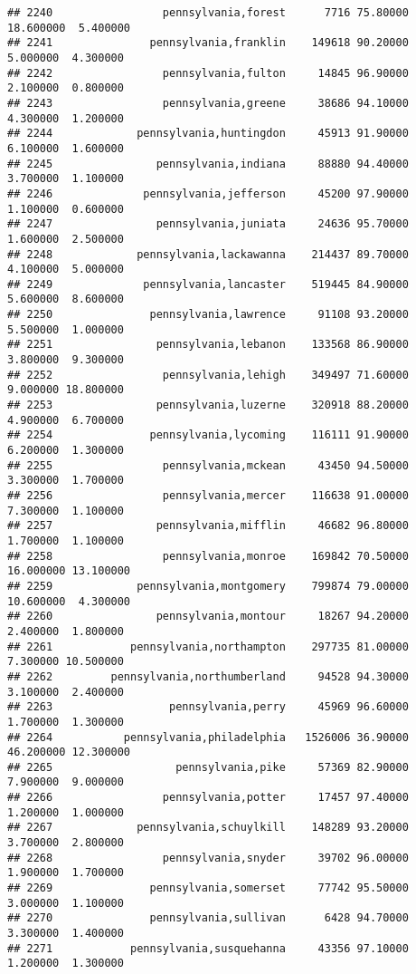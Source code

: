 \documentclass[
]{article}
\begin{document}
\begin{verbatim}
## 2240                 pennsylvania,forest      7716 75.80000 18.600000  5.400000
## 2241               pennsylvania,franklin    149618 90.20000  5.000000  4.300000
## 2242                 pennsylvania,fulton     14845 96.90000  2.100000  0.800000
## 2243                 pennsylvania,greene     38686 94.10000  4.300000  1.200000
## 2244             pennsylvania,huntingdon     45913 91.90000  6.100000  1.600000
## 2245                pennsylvania,indiana     88880 94.40000  3.700000  1.100000
## 2246              pennsylvania,jefferson     45200 97.90000  1.100000  0.600000
## 2247                pennsylvania,juniata     24636 95.70000  1.600000  2.500000
## 2248             pennsylvania,lackawanna    214437 89.70000  4.100000  5.000000
## 2249              pennsylvania,lancaster    519445 84.90000  5.600000  8.600000
## 2250               pennsylvania,lawrence     91108 93.20000  5.500000  1.000000
## 2251                pennsylvania,lebanon    133568 86.90000  3.800000  9.300000
## 2252                 pennsylvania,lehigh    349497 71.60000  9.000000 18.800000
## 2253                pennsylvania,luzerne    320918 88.20000  4.900000  6.700000
## 2254               pennsylvania,lycoming    116111 91.90000  6.200000  1.300000
## 2255                 pennsylvania,mckean     43450 94.50000  3.300000  1.700000
## 2256                 pennsylvania,mercer    116638 91.00000  7.300000  1.100000
## 2257                pennsylvania,mifflin     46682 96.80000  1.700000  1.100000
## 2258                 pennsylvania,monroe    169842 70.50000 16.000000 13.100000
## 2259             pennsylvania,montgomery    799874 79.00000 10.600000  4.300000
## 2260                pennsylvania,montour     18267 94.20000  2.400000  1.800000
## 2261            pennsylvania,northampton    297735 81.00000  7.300000 10.500000
## 2262         pennsylvania,northumberland     94528 94.30000  3.100000  2.400000
## 2263                  pennsylvania,perry     45969 96.60000  1.700000  1.300000
## 2264           pennsylvania,philadelphia   1526006 36.90000 46.200000 12.300000
## 2265                   pennsylvania,pike     57369 82.90000  7.900000  9.000000
## 2266                 pennsylvania,potter     17457 97.40000  1.200000  1.000000
## 2267             pennsylvania,schuylkill    148289 93.20000  3.700000  2.800000
## 2268                 pennsylvania,snyder     39702 96.00000  1.900000  1.700000
## 2269               pennsylvania,somerset     77742 95.50000  3.000000  1.100000
## 2270               pennsylvania,sullivan      6428 94.70000  3.300000  1.400000
## 2271            pennsylvania,susquehanna     43356 97.10000  1.200000  1.300000

\end{verbatim}
\end{document}
